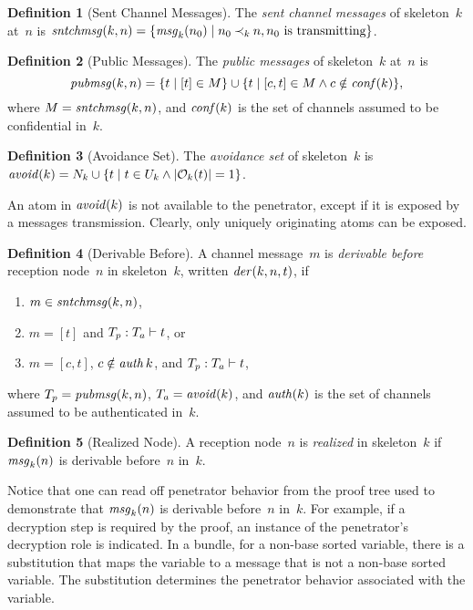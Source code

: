 \documentclass[12pt]{report}
\theoremstyle{definition}
\newtheorem{defn}{Definition}[chapter]
\newcommand{\sntchmsg}{\fn{sntchmsg}}
\newcommand{\pubmsg}{\fn{pubmsg}}
\newcommand{\auth}{\fn{auth}}
\newcommand{\conf}{\fn{conf}}
\newcommand{\avoid}{\fn{avoid}}
\newcommand{\msg}{\fn{msg}}
\begin{document}
\begin{defn}[Sent Channel Messages]
The \emph{sent channel messages} of
skeleton~$k$ at~$n$ is $\sntchmsg(k,n)=\{\msg_k(n_0)\mid n_0 \kprec{k}
n, n_0\mbox{~is transmitting}\}$.
\end{defn}

\begin{defn}[Public Messages]
The \emph{public messages} of
skeleton~$k$ at~$n$ is \[\pubmsg(k,n)=\{t\mid [t]\in M\}\cup
\{t\mid[c,t]\in M\land c\notin \conf(k)\},\] where $M=\sntchmsg(k, n)$,
and $\conf(k)$ is the set of channels assumed to be confidential in~$k$.

\end{defn}

\begin{defn}[Avoidance Set]\label{def:avoid}
The \emph{avoidance set} of skeleton~$k$ is
$\avoid(k)=N_k\cup\{t\mid t\in U_k\land|\orig_k(t)|=1\}$.
\end{defn}

An atom in $\avoid(k)$ is not available to the penetrator, except
if it is exposed by a messages transmission.  Clearly, only uniquely
originating atoms can be exposed.

\begin{defn}[Derivable Before]\label{def:der}
A channel message~$m$ is \emph{derivable
  before} reception node~$n$ in skeleton~$k$, written
$\fn{der}(k,n,t)$, if
\begin{enumerate}
\item $m\in\sntchmsg(k,n)$,
\item $m=[t]$ and $\der{t}{T_p}{T_a}$, or
\item $m=[c,t]$, $c\notin\auth{k}$, and $\der{t}{T_p}{T_a}$,
\end{enumerate}
where $T_p=\pubmsg(k,n)$, $T_a=\avoid(k)$, and $\auth(k)$ is the set
of channels assumed to be authenticated in~$k$.
\end{defn}

\begin{defn}[Realized Node]
A reception node~$n$ is \emph{realized} in skeleton~$k$ if
$\msg_k(n)$ is derivable before~$n$ in~$k$.
\end{defn}

Notice that one can read off penetrator behavior from the proof tree
used to demonstrate that $\msg_k(n)$ is derivable before~$n$
in~$k$.  For example, if a decryption step is required by the proof,
an instance of the penetrator's decryption role is indicated.  In a
bundle, for a non-base sorted variable, there is a substitution that
maps the variable to a message that is not a non-base sorted variable.
The substitution determines the penetrator behavior associated with
the variable.
\end{document}
